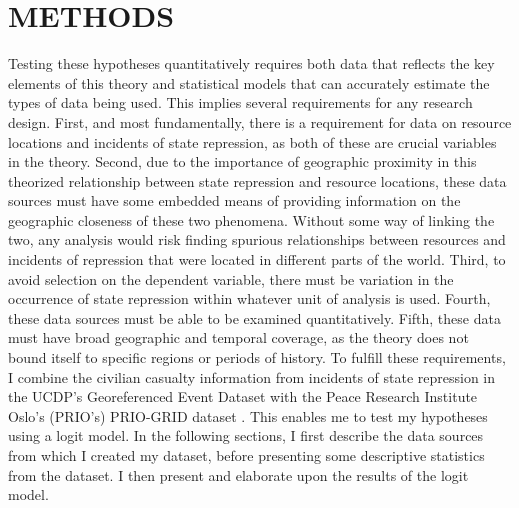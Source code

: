 \section*{\normalfont \hfill METHODS \hfill}
Testing these hypotheses quantitatively requires both data that reflects the key elements of this theory and statistical models that can accurately estimate the types of data being used. This implies several requirements for any research design. First, and most fundamentally, there is a requirement for data on resource locations and incidents of state repression, as both of these are crucial variables in the theory. Second, due to the importance of geographic proximity in this theorized relationship between state repression and resource locations, these data sources must have some embedded means of providing information on the geographic closeness of these two phenomena. Without some way of linking the two, any analysis would risk finding spurious relationships between resources and incidents of repression that were located in different parts of the world. Third, to avoid selection on the dependent variable, there must be variation in the occurrence of state repression within whatever unit of analysis is used. Fourth, these data sources must be able to be examined quantitatively. Fifth, these data must have broad geographic and temporal coverage, as the theory does not bound itself to specific regions or periods of history. To fulfill these requirements, I combine the civilian casualty information from incidents of state repression in the UCDP's Georeferenced Event Dataset \cite{SundbertMelander13} with the Peace Research Institute Oslo's (PRIO's) PRIO-GRID dataset \cite{priogridcode}. This enables me to test my hypotheses using a logit model. In the following sections, I first describe the data sources from which I created my dataset, before presenting some descriptive statistics from the dataset. I then present and elaborate upon the results of the logit model.

